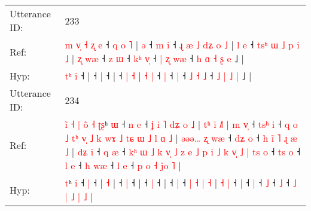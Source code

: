 \documentclass[10pt]{article}
\DeclareRobustCommand{\hl}[1]{{\textcolor{red}{#1}}}
\begin{document}
\begin{longtable}{ll}
 \\
\midrule
Utterance ID: & 233 \\
Ref: & \hl{m}\hl{ }\hl{v}\hl{̩}\hl{ }\hl{˧}\hl{ }\hl{ʐ} \hl{e} ˧\hl{ }\hl{q}\hl{ }\hl{o}\hl{ }\hl{˥} |\hl{ }\hl{ə} ˧\hl{ }\hl{m} \hl{i} ˧\hl{ }\hl{ɻ}\hl{ }\hl{æ}\hl{ }\hl{˩}\hl{ }\hl{d}\hl{ʑ}\hl{ }\hl{o}\hl{ }\hl{˩} |\hl{ }\hl{l}\hl{ }\hl{e} ˧\hl{ }\hl{t}\hl{s}\hl{ʰ}\hl{ }\hl{ɯ}\hl{ }\hl{˩}\hl{ }\hl{p} \hl{i} \hl{˩} | \hl{ʐ} \hl{w}\hl{æ} ˧\hl{ }\hl{z} \hl{ɯ} ˧\hl{ }\hl{k}\hl{ʰ} \hl{v}\hl{̩} ˧ \hl{|} \hl{ʐ} \hl{w}\hl{æ} ˧\hl{ }\hl{h} \hl{ɑ} \hl{˧} \hl{ʂ} \hl{e} ˩ |
 \\
Hyp: & \hl{}\hl{}\hl{}\hl{}\hl{}\hl{}\hl{t}\hl{ʰ} \hl{i} ˧\hl{}\hl{}\hl{}\hl{}\hl{}\hl{} |\hl{}\hl{} ˧\hl{}\hl{} \hl{|} ˧\hl{}\hl{}\hl{}\hl{}\hl{}\hl{}\hl{}\hl{}\hl{}\hl{}\hl{}\hl{}\hl{} |\hl{}\hl{}\hl{}\hl{} ˧\hl{}\hl{}\hl{}\hl{}\hl{}\hl{}\hl{}\hl{}\hl{}\hl{} \hl{|} \hl{˧} | \hl{˧} \hl{}\hl{|} ˧\hl{}\hl{} \hl{|} ˧\hl{}\hl{}\hl{} \hl{}\hl{|} ˧ \hl{˩} \hl{˧} \hl{}\hl{˩} ˧\hl{}\hl{} \hl{˩} \hl{|} \hl{˩} \hl{|} ˩ |
 \\
\midrule
Utterance ID: & 234 \\
Ref: & \hl{i}\hl{̃}\hl{ }\hl{˧}\hl{ }\hl{|}\hl{ }\hl{o}\hl{̃}\hl{ }\hl{˧}\hl{ }\hl{ʈ}\hl{ʂ}ʰ \hl{ɯ} ˧\hl{ }\hl{n} \hl{e} ˧\hl{ }\hl{ʝ}\hl{ }\hl{i}\hl{ }\hl{˥}\hl{ }\hl{d}\hl{ʑ}\hl{ }\hl{o}\hl{ }\hl{˩} |\hl{ }\hl{t}\hl{ʰ}\hl{ }\hl{i} \hl{˩}\hl{˥} |\hl{ }\hl{m}\hl{ }\hl{v}\hl{̩} ˧\hl{ }\hl{t}\hl{s}\hl{ʰ} \hl{i} ˧\hl{ }\hl{q}\hl{ }\hl{o}\hl{ }\hl{˩}\hl{ }\hl{t}\hl{ʰ}\hl{ }\hl{v}\hl{̩}\hl{ }\hl{˩}\hl{ }\hl{k}\hl{ }\hl{w}\hl{ɤ}\hl{ }\hl{˩}\hl{ }\hl{t}\hl{ɕ}\hl{ }\hl{ɯ}\hl{ }\hl{˩}\hl{ }\hl{l}\hl{ }\hl{ɑ}\hl{ }\hl{˩} |\hl{ }\hl{ə}\hl{ə}\hl{ə}\hl{…}\hl{ }\hl{ʐ}\hl{ }\hl{w}\hl{æ} ˧\hl{ }\hl{d}\hl{ʑ} \hl{o} ˧\hl{ }\hl{h}\hl{ }\hl{i}\hl{̃}\hl{ }\hl{˥}\hl{ }\hl{ɻ}\hl{ }\hl{æ}\hl{ }\hl{˩} |\hl{ }\hl{d}\hl{ʑ}\hl{ }\hl{i} ˧\hl{ }\hl{q} \hl{æ} ˧\hl{ }\hl{k}\hl{ʰ}\hl{ }\hl{ɯ}\hl{ }\hl{˩}\hl{ }\hl{k}\hl{ }\hl{v}\hl{̩}\hl{ }\hl{˩}\hl{ }\hl{z}\hl{ }\hl{e}\hl{ }\hl{˩}\hl{ }\hl{p}\hl{ }\hl{i} \hl{˩} \hl{k} \hl{v}\hl{̩} \hl{˩} | \hl{t}\hl{s} \hl{o} ˧\hl{ }\hl{t}\hl{s} \hl{o} ˧\hl{ }\hl{l} \hl{e} ˧\hl{ }\hl{h} \hl{w}\hl{æ} ˧\hl{ }\hl{l} \hl{e} ˧ \hl{p} \hl{o} \hl{˧} \hl{j}\hl{o} \hl{˥} |
 \\
Hyp: & \hl{}\hl{}\hl{}\hl{}\hl{}\hl{}\hl{}\hl{}\hl{}\hl{}\hl{}\hl{}\hl{}\hl{t}ʰ \hl{i} ˧\hl{}\hl{} \hl{|} ˧\hl{}\hl{}\hl{}\hl{}\hl{}\hl{}\hl{}\hl{}\hl{}\hl{}\hl{}\hl{}\hl{} |\hl{}\hl{}\hl{}\hl{}\hl{} \hl{}\hl{˧} |\hl{}\hl{}\hl{}\hl{}\hl{} ˧\hl{}\hl{}\hl{}\hl{} \hl{|} ˧\hl{}\hl{}\hl{}\hl{}\hl{}\hl{}\hl{}\hl{}\hl{}\hl{}\hl{}\hl{}\hl{}\hl{}\hl{}\hl{}\hl{}\hl{}\hl{}\hl{}\hl{}\hl{}\hl{}\hl{}\hl{}\hl{}\hl{}\hl{}\hl{}\hl{}\hl{}\hl{}\hl{}\hl{} |\hl{}\hl{}\hl{}\hl{}\hl{}\hl{}\hl{}\hl{}\hl{}\hl{} ˧\hl{}\hl{}\hl{} \hl{|} ˧\hl{}\hl{}\hl{}\hl{}\hl{}\hl{}\hl{}\hl{}\hl{}\hl{}\hl{}\hl{}\hl{} |\hl{}\hl{}\hl{}\hl{}\hl{} ˧\hl{}\hl{} \hl{|} ˧\hl{}\hl{}\hl{}\hl{}\hl{}\hl{}\hl{}\hl{}\hl{}\hl{}\hl{}\hl{}\hl{}\hl{}\hl{}\hl{}\hl{}\hl{}\hl{}\hl{}\hl{}\hl{}\hl{}\hl{} \hl{|} \hl{˧} \hl{}\hl{|} \hl{˧} | \hl{}\hl{˧} \hl{|} ˧\hl{}\hl{}\hl{} \hl{|} ˧\hl{}\hl{} \hl{|} ˧\hl{}\hl{} \hl{}\hl{˩} ˧\hl{}\hl{} \hl{˩} ˧ \hl{˩} \hl{|} \hl{˩} \hl{}\hl{|} \hl{˩} |

\end{longtable}
\end{document}
